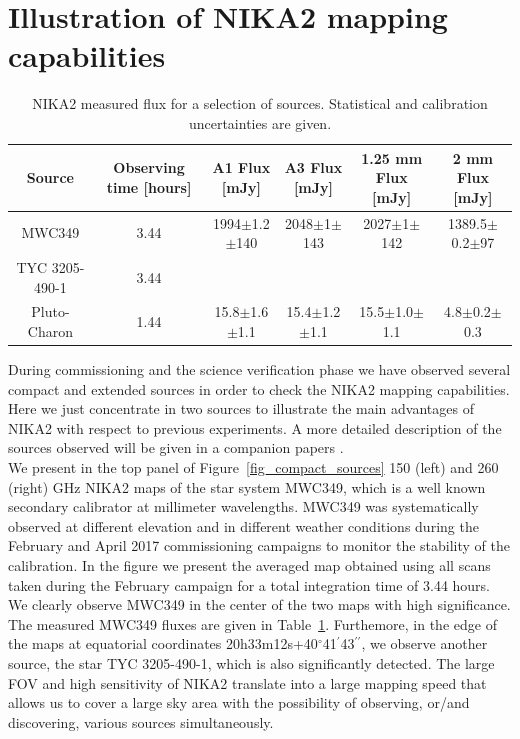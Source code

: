\documentclass[]{aa} %
\begin{document}
\section{Illustration of NIKA2 mapping capabilities}
\begin{table}
  \centering
  \caption{NIKA2 measured flux for a selection of sources. Statistical and calibration uncertainties are given. \label{fluxtab}}
\begin{tabular}{|c|c|c|c|c|c|}
\hline
Source         & Observing time [hours] &  A1 Flux [mJy]  & A3 Flux [mJy] & 1.25 mm Flux [mJy]  &   2 mm Flux [mJy] \\
\hline
\hline
MWC349         & 3.44     &  1994$\pm$1.2$\pm$140 & 2048$\pm$1$\pm$143 & 2027$\pm$1$\pm$142 & 1389.5$\pm$0.2$\pm$97\\
TYC 3205-490-1 & 3.44     &                & & &\\
Pluto-Charon   &   1.44  & 15.8$\pm$1.6$\pm$1.1   & 15.4$\pm$1.2$\pm$1.1 &  15.5$\pm$1.0$\pm$1.1 & 4.8$\pm$0.2$\pm$0.3 \\
\hline
\end{tabular}
\end{table}


During commissioning and the science verification phase we have observed several compact and extended sources 
in order to check the NIKA2 mapping capabilities. Here we just concentrate in two sources to illustrate the main advantages of NIKA2 with respect to previous experiments. A more detailed description of the sources observed will be given in a companion papers \cite{commissioning,pipeline}. \\

We present in the top panel of Figure~\ref{fig_compact_sources} 150 (left) and 260 (right) GHz NIKA2 maps of the star system MWC349, which is a well known secondary calibrator at millimeter wavelengths. MWC349 was systematically observed at different elevation and in different weather conditions during the February and April 2017 commissioning campaigns to monitor the stability of the calibration. In the figure we present the averaged map obtained using all scans taken during the February
campaign for a total integration time of 3.44 hours. We clearly observe MWC349 in the center of the two maps with high significance. The measured MWC349 fluxes are given in Table~\ref{fluxtab}. Furthemore, in the edge of the maps at equatorial coordinates 
20h33m12s+40$^{\circ}$41$^{\prime}$43$^{\prime \prime}$, we observe another source, the star TYC 3205-490-1, which is also significantly detected. The large FOV and high sensitivity of NIKA2 translate into a large mapping speed that allows us to cover a large sky area with the possibility of observing, or/and discovering, various sources simultaneously. \\
\end{document}
